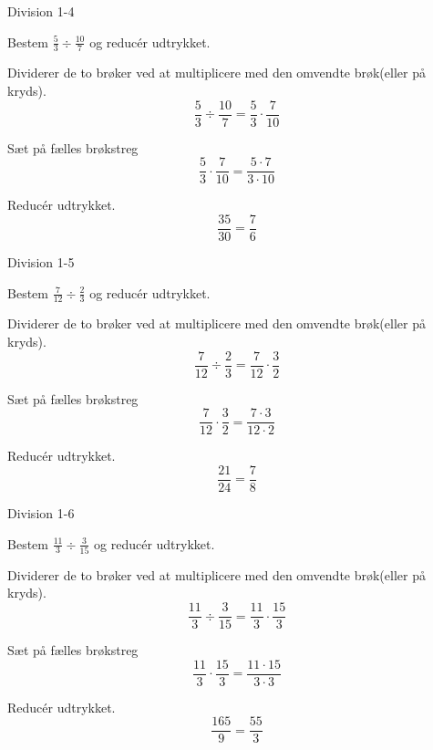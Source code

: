 \documentclass{article}
\begin{document}
\newpage

\begin{exercise}{Division 1-4}

Bestem $\frac{5}{3} \div \frac{10}{7}$ og reducér udtrykket.


\hint

Dividerer de to brøker ved at multiplicere med den omvendte brøk(eller på kryds).
\[
\frac{5}{3} \div \frac{10}{7} = \frac{5}{3} \cdot \frac{7}{10}
\]

\hint

Sæt på fælles brøkstreg
\[
 \frac{5}{3} \cdot \frac{7}{10} = \frac{5 \cdot 7}{3 \cdot 10}
\]

\hint

Reducér udtrykket.
\[
\frac{35}{30} = \frac{7}{6}
\]

\end{exercise}


\newpage

\begin{exercise}{Division 1-5}

Bestem $\frac{7}{12} \div \frac{2}{3}$ og reducér udtrykket.


\hint

Dividerer de to brøker ved at multiplicere med den omvendte brøk(eller på kryds).
\[
\frac{7}{12} \div \frac{2}{3} = \frac{7}{12} \cdot \frac{3}{2}
\]

\hint

Sæt på fælles brøkstreg
\[
\frac{7}{12} \cdot \frac{3}{2} = \frac{7 \cdot 3}{12 \cdot 2}
\]

\hint

Reducér udtrykket.
\[
\frac{21}{24} = \frac{7}{8}
\]

\end{exercise}

\newpage

\begin{exercise}{Division 1-6}

Bestem $\frac{11}{3} \div \frac{3}{15}$ og reducér udtrykket.


\hint

Dividerer de to brøker ved at multiplicere med den omvendte brøk(eller på kryds).
\[
\frac{11}{3} \div \frac{3}{15} = \frac{11}{3} \cdot \frac{15}{3}
\]

\hint

Sæt på fælles brøkstreg
\[
\frac{11}{3} \cdot \frac{15}{3} = \frac{11 \cdot 15}{3 \cdot 3}
\]

\hint

Reducér udtrykket.
\[
\frac{165}{9} = \frac{55}{3}
\]

\end{exercise}
\end{document}
